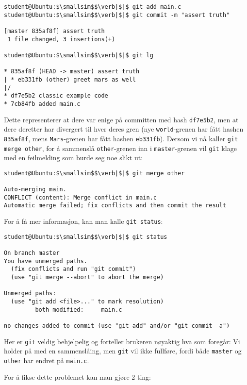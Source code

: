 \begin{alphasection}
\begin{lstlisting}[mathescape=true]
student@Ubuntu:$\smallsim$$\verb|$|$ git add main.c
student@Ubuntu:$\smallsim$$\verb|$|$ git commit -m "assert truth"

[master 835af8f] assert truth
 1 file changed, 3 insertions(+)

student@Ubuntu:$\smallsim$$\verb|$|$ git lg

* 835af8f (HEAD -> master) assert truth
| * eb331fb (other) greet mars as well
|/  
* df7e5b2 classic example code
* 7cb84fb added main.c
\end{lstlisting}


Dette representerer at dere var enige på committen med hash \verb|df7e5b2|, men at dere deretter har divergert til hver deres gren (nye \verb|world|-grenen har fått hashen \verb|835af8f|, mens \verb|Mars|-grenen har fått hashen \verb|eb331fb|). Dersom vi nå kaller \verb|git merge other|, for å sammenslå \verb|other|-grenen inn i \verb|master|-grenen vil \verb|git| klage med en feilmelding som burde seg noe slikt ut:

\begin{lstlisting}[mathescape=true]
student@Ubuntu:$\smallsim$$\verb|$|$ git merge other

Auto-merging main.
CONFLICT (content): Merge conflict in main.c
Automatic merge failed; fix conflicts and then commit the result
\end{lstlisting}

For å få mer informasjon, kan man kalle \verb|git status|:

\begin{lstlisting}[mathescape=true]
student@Ubuntu:$\smallsim$$\verb|$|$ git status

On branch master
You have unmerged paths.
  (fix conflicts and run "git commit")
  (use "git merge --abort" to abort the merge)
  
Unmerged paths:
  (use "git add <file>..." to mark resolution)
         both modified:     main.c

no changes added to commit (use "git add" and/or "git commit -a")
\end{lstlisting}

Her er \verb|git| veldig behjelpelig og forteller brukeren nøyaktig hva som foregår: Vi holder på med en sammenslåing, men \verb|git| vil ikke fullføre, fordi både \verb|master| og \verb|other| har endret på \verb|main.c|.

For å fikse dette problemet kan man gjøre 2 ting:


\end{alphasection}
